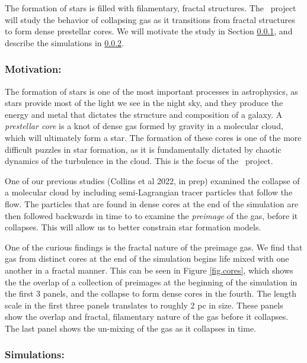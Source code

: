 
The formation of stars is filled with filamentary, fractal structures.  The
\nameCores\ project will study the behavior of collapsing gas as it transitions
from fractal structures to form dense prestellar cores.  We will motivate the
study in Section \ref{subsec.cores_motivate}, and describe the simulations
in \ref{subsec.cores_sims}.


\subsubsection{Motivation: \nameCores}
\label{subsec.cores_motivate}
The formation of stars is one of the most important processes in astrophysics,
as stars provide most of the light we see in the night sky, and they produce the
energy and metal
that dictates the structure and composition of a galaxy.  
A \emph{prestellar core} is a knot of dense gas
formed by gravity in a molecular cloud, which will ultimately form a star.  The
formation of these cores is one of the more difficult puzzles in star formation,
as it is fundamentally dictated by chaotic dynamics of the turbulence in the
cloud.  This is the focus of the \nameCores\ project.

One of our previous studies (Collins et al 2022, in prep) examined the collapse of a molecular cloud by
including semi-Lagrangian tracer particles that follow the flow.  The particles
that are found in dense cores at the end of the simulation are then followed
backwards in time to 
to examine the \emph{preimage} of the gas, before it collapses.  This will allow
us to better constrain star formation models.  

One of the curious findings is the fractal nature of the preimage gas.  We find
that gas from distinct cores at the end of the simulation begins life mixed with
one another in a fractal manner. This can be seen in Figure
\ref{fig.cores}, which shows the the overlap of a collection of preimages at the
beginning of the simulation in the first 3 panels, and the
collapse to form dense cores in the fourth.  The length scale in the first three panels translates to
roughly 2 pc in size.  These panels show the overlap and fractal, filamentary nature of
the gas before it collapses.  The
last panel shows the un-mixing of the gas as it collapses in time.

\subsubsection{Simulations: \nameCores}
\label{subsec.cores_sims}

